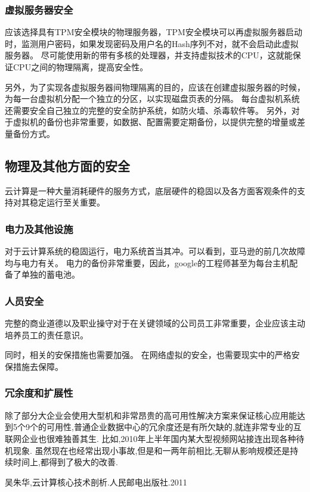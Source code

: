 \documentclass[a4paper]{ctexart}
\begin{document}
        \subsubsection{虚拟服务器安全}
            \par 应该选择具有TPM安全模块的物理服务器，TPM安全模块可以再虚拟服务器启动时，监测用户密码，如果发现密码及用户名的Hash序列不对，就不会启动此虚拟服务器。 尽可能使用新的带有多核的处理器，并支持虚拟技术的CPU，这就能保证CPU之间的物理隔离，提高安全性。
            \par 另外，为了实现各虚拟服务器间物理隔离的目的，应该在创建虚拟服务器的时候，为每一台虚拟机分配一个独立的分区，以实现磁盘页表的分隔。 每台虚拟机系统还需要安全自己独立的完整的安全防护系统，如防火墙、杀毒软件等。 另外，对于虚拟机的备份也非常重要，如数据、配置需要定期备份，以提供完整的增量或差量备份方式。

        \subsection{物理及其他方面的安全}
        \par 云计算是一种大量消耗硬件的服务方式，底层硬件的稳固以及各方面客观条件的支持对其稳定运行至关重要。
        \subsubsection{电力及其他设施}
        \par 对于云计算系统的稳固运行，电力系统首当其冲。可以看到，亚马逊的前几次故障均与电力有关。 电力的备份非常重要，因此，google的工程师甚至为每台主机配备了单独的蓄电池。
        \subsubsection{人员安全}
        \par 完整的商业道德以及职业操守对于在关键领域的公司员工非常重要，企业应该主动培养员工的责任意识。
        \par 同时，相关的安保措施也需要加强。 在网络虚拟的安全，也需要现实中的严格安保措施去保障。
        \subsubsection{冗余度和扩展性}
        \par 除了部分大企业会使用大型机和非常昂贵的高可用性解决方案来保证核心应用能达到5个9个的可用性,普通企业数据中心的冗余度还是有所欠缺的,就连非常专业的互联网企业也很难独善其生. 比如,2010年上半年国内某大型视频网站接连出现各种待机现象. 虽然现在也经常出现小事故,但是和一两年前相比,无聊从影响规模还是持续时间上,都得到了极大的改善.\cite{core-tech}
        \begin{thebibliography}{sotief}
                 吴朱华,云计算核心技术剖析.人民邮电出版社.2011
        \end{thebibliography}
\end{document}

